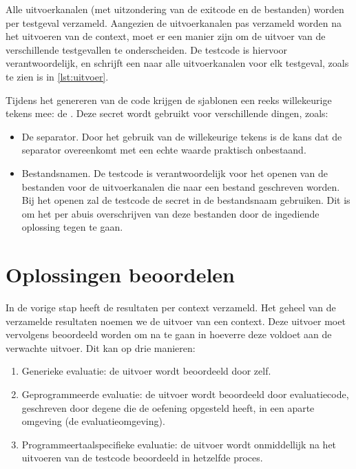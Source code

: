 Alle uitvoerkanalen (met uitzondering van de exitcode en de bestanden) worden per testgeval verzameld.
Aangezien de uitvoerkanalen pas verzameld worden na het uitvoeren van de context, moet er een manier zijn om de uitvoer van de verschillende testgevallen te onderscheiden.
De testcode is hiervoor verantwoordelijk, en schrijft een  naar alle uitvoerkanalen voor elk testgeval, zoals te zien is in \cref{lst:uitvoer}.

Tijdens het genereren van de code krijgen de sjablonen een reeks willekeurige tekens mee: de .
Deze secret wordt gebruikt voor verschillende dingen, zoals:
\begin{itemize}
    \item De separator.
    Door het gebruik van de willekeurige tekens is de kans dat de separator overeenkomt met een echte waarde praktisch onbestaand.
    \item Bestandsnamen.
    De testcode is verantwoordelijk voor het openen van de bestanden voor de uitvoerkanalen die naar een bestand geschreven worden.
    Bij het openen zal de testcode de secret in de bestandsnaam gebruiken.
    Dit is om het per abuis overschrijven van deze bestanden door de ingediende oplossing tegen te gaan.
\end{itemize}

\section{Oplossingen beoordelen}\label{sec:oplossingen-beoordelen}

In de vorige stap heeft \tested{} de resultaten per context verzameld.
Het geheel van de verzamelde resultaten noemen we de uitvoer van een context.
Deze uitvoer moet vervolgens beoordeeld worden om na te gaan in hoeverre deze voldoet aan de verwachte uitvoer.
Dit kan op drie manieren:
\begin{enumerate}
    \item Generieke evaluatie: de uitvoer wordt beoordeeld door \tested{} zelf.
    \item Geprogrammeerde evaluatie: de uitvoer wordt beoordeeld door evaluatiecode, geschreven door degene die de oefening opgesteld heeft, in een aparte omgeving (de evaluatieomgeving).
    \item Programmeertaalspecifieke evaluatie: de uitvoer wordt onmiddellijk na het uitvoeren van de testcode beoordeeld in hetzelfde proces.
\end{enumerate}

